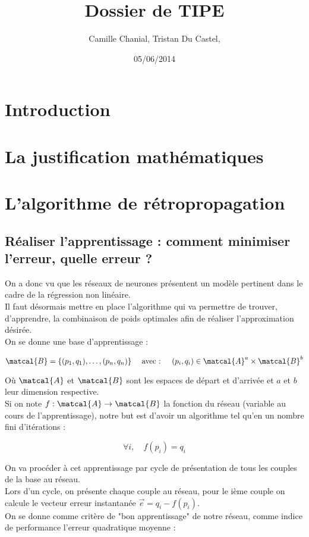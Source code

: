 \documentclass[a4paper, 11pt]{article}
\begin{document}
 
\title{Dossier de TIPE}
\author{Camille Chanial, Tristan Du Castel, }
\date{05/06/2014} 
 
\maketitle

 
\tableofcontents
 

\newpage

\section{Introduction}
\section{La justification mathématiques}
\section{L'algorithme de rétropropagation}

\subsection{Réaliser l'apprentissage : comment minimiser l'erreur, quelle erreur ?}

On a donc vu que les réseaux de neurones présentent un modèle pertinent dans le cadre de la régression non linéaire.\\
Il faut désormais mettre en place l'algorithme qui va permettre de trouver, d'apprendre, la combinaison de poids optimales afin de réaliser l'approximation désirée.\\
On se donne une base d'apprentissage :

$$\matcal{B} = \{(p_1,q_1), \dots, (p_n, q_n)\} \quad \text{ avec : } \quad (p_i,q_i) \in \matcal{A}^a \times \matcal{B}^b$$

Où $\matcal{A}$ et $\matcal{B}$ sont les espaces de départ et d'arrivée et $a$ et $b$ leur dimension respective.\\
Si on note $f:\matcal{A}\to \matcal{B}$ la fonction du réseau (variable au cours de l'apprentissage), notre but est d'avoir un algorithme tel qu'en un nombre fini d'itérations :

$$ \forall i, \quad f(p_i) = q_i $$

On va procéder à cet apprentissage par cycle de présentation de tous les couples de la base au réseau.\\
Lors d'un cycle, on présente chaque couple au réseau, pour le ième couple on calcule le vecteur erreur instantanée $\vec{e} = q_i-f(p_i)$.\\
On se donne comme critère de "bon apprentissage" de notre réseau, comme indice de performance l'erreur quadratique moyenne :
\end{document}
